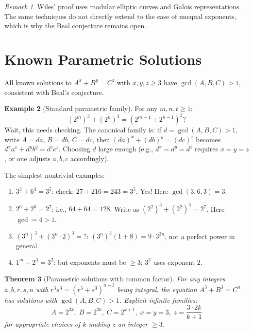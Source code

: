\documentclass[12pt,a4paper]{amsart}
\newtheorem{theorem}{Theorem}[section]
\theoremstyle{definition}
\newtheorem{example}[theorem]{Example}
\theoremstyle{remark}
\newtheorem{remark}[theorem]{Remark}
\begin{document}
\begin{remark}
Wiles' proof uses modular elliptic curves and Galois representations. The same
techniques do not directly extend to the case of unequal exponents, which is why
the Beal conjecture remains open.
\end{remark}

\section{Known Parametric Solutions}

All known solutions to $A^x + B^y = C^z$ with $x, y, z \geq 3$ have $\gcd(A,B,C) > 1$,
consistent with Beal's conjecture.

\begin{example}[Standard parametric family]\label{ex:param}
For any $m, n, t \geq 1$:
\[
  (2^m)^3 + (2^n)^3 = (2^{m-1} + 2^{n-1})^3?
\]
Wait, this needs checking. The canonical family is: if $d = \gcd(A,B,C) > 1$,
write $A = da$, $B = db$, $C = dc$, then $(da)^x + (db)^y = (dc)^z$ becomes
$d^x a^x + d^y b^y = d^z c^z$. Choosing $d$ large enough (e.g., $d^x = d^y = d^z$
requires $x = y = z$, or one adjusts $a,b,c$ accordingly).

The simplest nontrivial examples:
\begin{enumerate}[label=(\alph*)]
  \item $3^3 + 6^3 = 3^5$: check: $27 + 216 = 243 = 3^5$. Yes! Here
        $\gcd(3,6,3) = 3$.
  \item $2^6 + 2^6 = 2^7$: i.e., $64 + 64 = 128$. Write as $(2^2)^3 + (2^2)^3 = 2^7$.
        Here $\gcd = 4 > 1$.
  \item $(3^n)^3 + (3^n \cdot 2)^3 = ?$: $(3^n)^3(1 + 8) = 9 \cdot 3^{3n}$,
        not a perfect power in general.
  \item $1^m + 2^3 = 3^2$: but exponents must be $\geq 3$; $3^2$ uses exponent $2$.
\end{enumerate}
\end{example}

\begin{theorem}[Parametric solutions with common factor]\label{thm:param}
For any integers $a, b, r, s, n$ with $r^3 s^3 = (r^3 + s^3)^{n-3}$ being
integral, the equation $A^3 + B^3 = C^n$ has solutions with $\gcd(A,B,C) > 1$.
Explicit infinite families:
\[
  A = 2^{2k},\; B = 2^{2k},\; C = 2^{k+1},\; x=y=3,\; z = \frac{3 \cdot 2k}{k+1}
\]
for appropriate choices of $k$ making $z$ an integer $\geq 3$.
\end{theorem}
\end{document}
